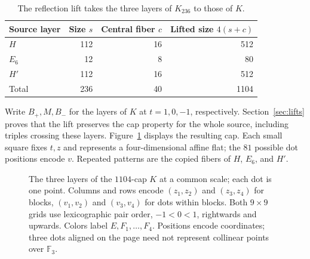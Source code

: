 \documentclass[11pt]{article}
\newcommand{\F}{\mathbb F_3}
\begin{document}
\begin{table}[ht]
\centering
\begin{tabular}{lrrr}
\toprule
Source layer & Size $s$ & Central fiber $c$ & Lifted size $4(s+c)$\\
\midrule
$H$   & 112 & 16 & 512\\
$E_6$ & 12  & 8  & 80\\
$H'$  & 112 & 16 & 512\\
\midrule
Total & 236 & 40 & 1104\\
\bottomrule
\end{tabular}
\caption{The reflection lift takes the three layers of $K_{236}$ to those of $K$.}
\label{tab:counts}
\end{table}

Write $B_+,M,B_-$ for the layers of $K$ at $t=1,0,-1$, respectively.
Section~\ref{sec:lifts} proves that the lift preserves the cap property
for the whole source, including triples crossing these layers.
Figure~\ref{fig:construction} displays the resulting cap. Each small
square fixes $t,z$ and represents a four-dimensional affine flat; the
$81$ possible dot positions encode $v$. Repeated patterns are the copied
fibers of $H$, $E_6$, and $H'$.

\begin{figure}[p]
\begin{lrbox}{\atlasbox}
\begin{minipage}{\textwidth}
\centering

\setlength{\abovecaptionskip}{6pt}
\caption{The three layers of the $1104$-cap $K$ at a common scale; each dot is one point.
Columns and rows encode $(z_1,z_2)$ and $(z_3,z_4)$ for blocks,
$(v_1,v_2)$ and $(v_3,v_4)$ for dots within blocks.
Both $9\times9$ grids use lexicographic pair order,
$-1<0<1$, rightwards and upwards. Colors label $E,F_1,\ldots,F_4$.
Positions encode coordinates; three dots aligned on the page need not
represent collinear points over $\F$.}
\label{fig:construction}
\end{minipage}
\end{lrbox}
\ifdim\dimexpr\ht\atlasbox+\dp\atlasbox\relax>\textheight
  \PackageError{cap-atlas}{The atlas and caption exceed one page:
    \the\dimexpr\ht\atlasbox+\dp\atlasbox\relax\space versus \the\textheight}
    {Reduce the panel size or shorten the caption.}
\fi
\usebox{\atlasbox}
\end{figure}
\restoregeometry
\end{document}
